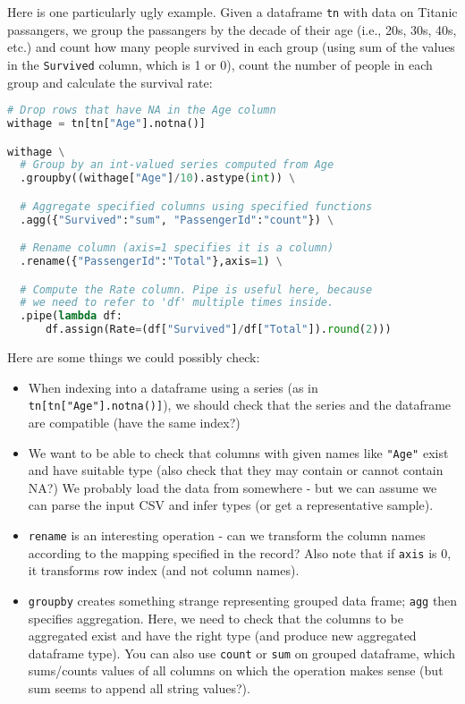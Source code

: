 \documentclass{article}
\begin{document}
Here is one particularly ugly example. Given a dataframe \texttt{tn} with data on Titanic passangers, we group the passangers by the decade of their age (i.e., 20s, 30s, 40s, etc.)
and count how many people survived in each group (using sum of the values in the \texttt{Survived}
column, which is 1 or 0), count the number of people in each group and calculate the survival rate:

\begin{lstlisting}[language=Python]
# Drop rows that have NA in the Age column
withage = tn[tn["Age"].notna()]

withage \
  # Group by an int-valued series computed from Age
  .groupby((withage["Age"]/10).astype(int)) \

  # Aggregate specified columns using specified functions
  .agg({"Survived":"sum", "PassengerId":"count"}) \

  # Rename column (axis=1 specifies it is a column)
  .rename({"PassengerId":"Total"},axis=1) \

  # Compute the Rate column. Pipe is useful here, because
  # we need to refer to 'df' multiple times inside.
  .pipe(lambda df:
      df.assign(Rate=(df["Survived"]/df["Total"]).round(2)))
\end{lstlisting}
Here are some things we could possibly check:

\begin{itemize}
\item When indexing into a dataframe using a series (as in \texttt{tn[tn["Age"].notna()]}),
  we should check that the series and the dataframe are compatible (have the same index?)

\item We want to be able to check that columns with given names like \texttt{"Age"} exist and
  have suitable type (also check that they may contain or cannot contain NA?) We probably load
  the data from somewhere - but we can assume we can parse the input CSV and infer types (or get a representative sample).

\item \texttt{rename} is an interesting operation - can we transform the column names according to
  the mapping specified in the record? Also note that if \texttt{axis} is 0, it transforms row index (and not column names).

\item \texttt{groupby} creates something strange representing grouped data frame; \texttt{agg}
  then specifies aggregation. Here, we need to check that the columns to be aggregated exist and have the right type (and produce new aggregated dataframe type). You can also use \texttt{count} or \texttt{sum} on grouped dataframe, which sums/counts values of all columns on which the operation makes sense (but sum seems to append all string values?).
\end{itemize}
\end{document}
